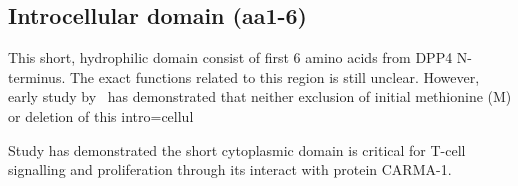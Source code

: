 \subsection{Introcellular domain (aa1-6)}

This short, hydrophilic domain consist of first 6 amino acids from DPP4 N-terminus. The exact functions related to this region is still unclear. However, early study by~\citet{Hong1990} has demonstrated that neither exclusion of initial methionine (M) or deletion of this intro=cellul

Study has demonstrated the short cytoplasmic domain is critical for T-cell signalling and proliferation through its interact with protein CARMA-1. \cite{Ohnuma_2007}